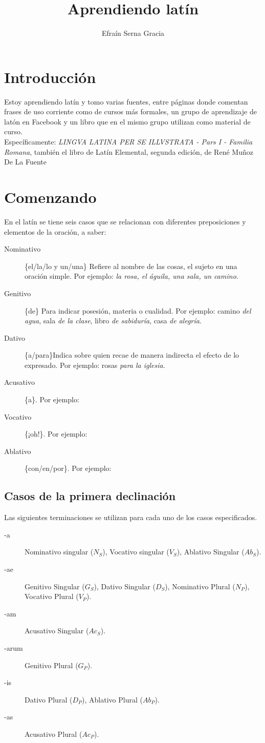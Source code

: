 \documentclass[landscape,12pt,twocolumn]{article} %
\title{Aprendiendo latín}
\author{Efraín Serna Gracia}
\begin{document}
\maketitle

\section*{Introducción}
Estoy aprendiendo latín y tomo varias fuentes, entre páginas donde comentan frases de uso corriente como de cursos más formales, un grupo de aprendizaje de latón en Facebook y un libro que en el mismo grupo utilizan como material de curso.\\

Específicamente: \emph{LINGVA LATINA PER SE ILLVSTRATA - Pars I - Familia Romana}, también el libro de Latín Elemental, segunda edición, de René Muñoz De La Fuente
\section{Comenzando}
En el latín se tiene seis casos que se relacionan con diferentes preposiciones y elementos de la oración, a saber:
\begin{description}
\item[Nominativo] \{el/la/lo y un/una\} Refiere al nombre de las cosas, el sujeto en una oración simple. Por ejemplo: \emph{la rosa, el águila, una sala, un camino}.
\item[Genitivo] \{de\} Para indicar posesión, materia o cualidad. Por ejemplo: camino \emph{del agua}, sala \emph{de la clase}, libro \emph{de sabiduría}, casa \emph{de alegría}.
\item[Dativo] \{a/para\}Indica sobre quien recae  de manera indirecta el efecto de lo expresado. Por ejemplo: rosas \emph{para la iglesia}.
\item[Acusativo] \{a\}. Por ejemplo: \emph{}
\item[Vocativo]\{¡oh!\}. Por ejemplo: \emph{}
\item[Ablativo]\{con/en/por\}. Por ejemplo: \emph{}
\end{description}
\subsection{Casos de la primera declinación}
Las siguientes terminaciones se utilizan para cada uno de los casos especificados.
\begin{description}
\item[-a] Nominativo singular ($N_S$), Vocativo singular ($V_S$), Ablativo Singular ($Ab_S$).
\item[-ae] Genitivo Singular ($G_S$), Dativo Singular ($D_S$), Nominativo Plural ($N_P$), Vocativo Plural ($V_P$).
\item[-am] Acusativo Singular ($Ac_S$).
\item[-arum] Genitivo Plural ($G_P$).
\item[-is] Dativo Plural ($D_P$), Ablativo Plural ($Ab_P$).
\item[-as] Acusativo Plural ($Ac_P$).
\end{description}
\end{document}
